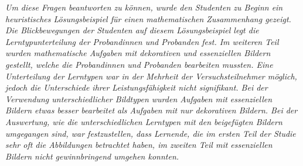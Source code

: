 \textit{Um diese Fragen beantworten zu können, wurde den Studenten zu Beginn ein heuristisches Lösungsbeispiel für einen mathematischen Zusammenhang gezeigt. Die Blickbewegungen der Studenten auf diesem Lösungsbeispiel legt die Lerntypunterteilung der Probandinnen und Probanden fest. Im weiteren Teil wurden mathematische Aufgaben mit dekorativen und essenziellen Bildern gestellt, welche die Probandinnen und Probanden bearbeiten mussten. Eine Unterteilung der Lerntypen war in der Mehrheit der Versuchsteilnehmer möglich, jedoch die Unterschiede ihrer Leistungsfähigkeit nicht signifikant. Bei der Verwendung unterschiedlicher Bildtypen wurden Aufgaben mit essenziellen Bildern etwas besser bearbeitet als Aufgaben mit nur dekorativen Bildern. Bei der Auswertung, wie die unterschiedlichen Lerntypen mit den beigefügten Bildern umgegangen sind, war festzustellen, dass Lernende, die im ersten Teil der Studie sehr oft die Abbildungen betrachtet haben, im zweiten Teil mit essenziellen Bildern nicht gewinnbringend umgehen konnten.}


\tableofcontents %










\printbibliography
\clearpage

\listoffigures %

\printacronyms[title={Abkürzungsverzeichnis}] %

\listoftables %

\onehalfspacing
